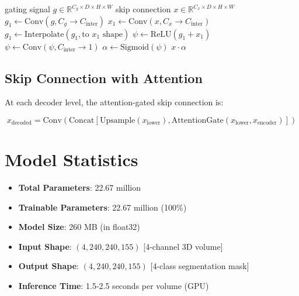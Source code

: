 \documentclass{ecsproject}     %
\begin{document}
\begin{algorithm}
\caption{Attention Gate Forward Pass}
\begin{algorithmic}[1]
\REQUIRE gating signal $g \in \mathbb{R}^{C_g \times D \times H \times W}$
\REQUIRE skip connection $x \in \mathbb{R}^{C_x \times D \times H \times W}$
\STATE $g_1 \leftarrow \text{Conv}(g, C_g \rightarrow C_{\text{inter}})$
\STATE $x_1 \leftarrow \text{Conv}(x, C_x \rightarrow C_{\text{inter}})$
    \STATE $g_1 \leftarrow \text{Interpolate}(g_1, \text{to } x_1 \text{ shape})$
\ENDIF
\STATE $\psi \leftarrow \text{ReLU}(g_1 + x_1)$
\STATE $\psi \leftarrow \text{Conv}(\psi, C_{\text{inter}} \rightarrow 1)$
\STATE $\alpha \leftarrow \text{Sigmoid}(\psi)$
\RETURN $x \cdot \alpha$
\end{algorithmic}
\end{algorithm}

\subsection{Skip Connection with Attention}

At each decoder level, the attention-gated skip connection is:

\begin{equation}
x_{\text{decoded}} = \text{Conv}(\text{Concat}[\text{Upsample}(x_{\text{lower}}), \text{AttentionGate}(x_{\text{lower}}, x_{\text{encoder}})])
\end{equation}

\section{Model Statistics}

\begin{itemize}
    \item \textbf{Total Parameters}: 22.67 million
    \item \textbf{Trainable Parameters}: 22.67 million (100\%)
    \item \textbf{Model Size}: 260 MB (in float32)
    \item \textbf{Input Shape}: $(4, 240, 240, 155)$ [4-channel 3D volume]
    \item \textbf{Output Shape}: $(4, 240, 240, 155)$ [4-class segmentation mask]
    \item \textbf{Inference Time}: 1.5-2.5 seconds per volume (GPU)
\end{itemize}

\end{document}
